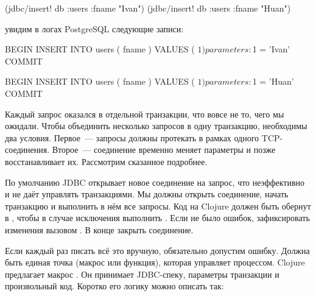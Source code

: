 \begin{english}
  \begin{clojure}
(jdbc/insert! db :users {:fname "Ivan"})
(jdbc/insert! db :users {:fname "Huan"})
  \end{clojure}
\end{english}

\noindent
увидим в логах PostgreSQL следующие записи:

\begin{english}
  \begin{sql}
BEGIN
INSERT INTO users ( fname ) VALUES ( $1 )
parameters: $1 = 'Ivan'
COMMIT

BEGIN
INSERT INTO users ( fname ) VALUES ( $1 )
parameters: $1 = 'Huan'
COMMIT
  \end{sql}
\end{english}

Каждый запрос оказался в отдельной транзакции, что вовсе не то, чего мы ожидали. Чтобы объединить несколько запросов в одну транзакцию, необходимы два условия. Первое~--- запросы должны протекать в рамках одного TCP-соединения. Второе~--- соединение временно меняет параметры и позже восстанавливает их. Рассмотрим сказанное подробнее.

По умолчанию JDBC открывает новое соединение на запрос, что неэффективно и не даёт управлять транзакциями. Мы должны открыть соединение, начать транзакцию и выполнить в нём все запросы. Код на Clojure должен быть обернут в , чтобы в случае исключения выполнить . Если не было ошибок, зафиксировать изменения вызовом . В конце закрыть соединение.

Если каждый раз писать всё это вручную, обязательно допустим ошибку. Должна быть единая точка (макрос или функция), которая управляет процессом. Clojure предлагает макрос . Он принимает JDBC-спеку, параметры транзакции и произвольный код. Коротко его логику можно описать так:


